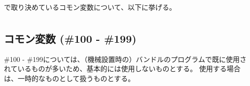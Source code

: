 
\DMname で取り決めているコモン変数について、以下に挙げる。



\section{\DMname}



\subsection{コモン変数 (\#100 - \#199)}
\#100 - \#199については、（機械設置時の）バンドルのプログラムで既に使用されているものが多いため、基本的には使用しないものとする。
使用する場合は、一時的なものとして扱うものとする。



